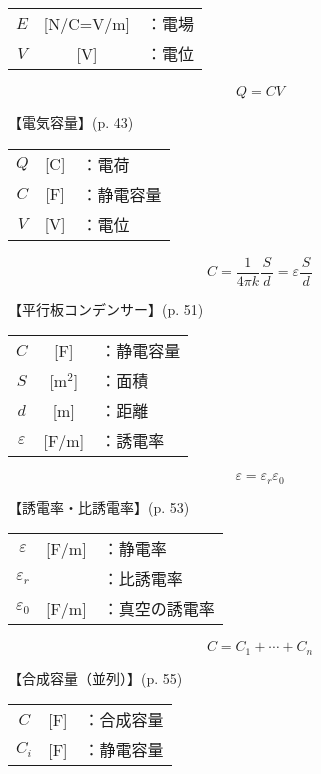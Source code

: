 \documentclass[10pt]{jarticle}
\begin{document}
\begin{tabular}{ccl}
$E$	&[N/C=V/m]	&：電場 \\
$V$	&[V]	&：電位
\end{tabular}





\newpage
\[
Q = C V
\]


\vskip3mm
\noindent
【電気容量】{\footnotesize (p. 43)}

\begin{tabular}{ccl}
$Q$	&[C]	&：電荷 \\
$C$	&[F]	&：静電容量 \\
$V$	&[V]	&：電位
\end{tabular}





\newpage
\[
C = \frac{1}{4\pi k} \frac{S}{\, d \,} = \varepsilon \frac{S}{\, d \,}
\]


\vskip3mm
\noindent
【平行板コンデンサー】{\footnotesize (p. 51)}

\begin{tabular}{ccl}
$C$	&[F]	&：静電容量 \\
$S$	&[m$^2$]	&：面積 \\
$d$	&[m]	&：距離 \\
$\varepsilon$	&[F/m]	&：誘電率
\end{tabular}




\newpage
\[
\varepsilon = \varepsilon_r \varepsilon_0
\]


\vskip3mm
\noindent
【誘電率・比誘電率】{\footnotesize (p. 53)}

\begin{tabular}{ccl}
$\varepsilon$	&[F/m]	&：静電率 \\
$\varepsilon_r$	&	&：比誘電率\\
$\varepsilon_0$	&[F/m]	&：真空の誘電率
\end{tabular}






\newpage
\[
C = C_1 + \cdots + C_n
\]


\vskip3mm
\noindent
【合成容量（並列）】{\footnotesize (p. 55)}

\begin{tabular}{ccl}
$C$	&[F]	&：合成容量 \\
$C_i$	&[F]	&：静電容量 \\
\end{tabular}
\end{document}

